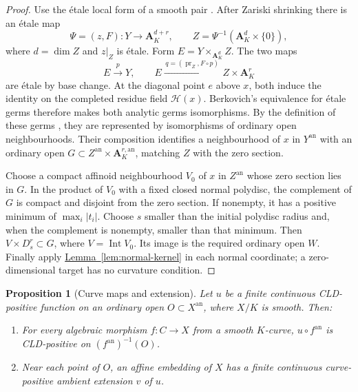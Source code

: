 \documentclass[11pt]{amsart}
\newtheorem{proposition}[theorem]{Proposition}
\theoremstyle{definition}
\theoremstyle{remark}
\numberwithin{equation}{section}
\newcommand{\an}{\mathrm{an}}
\newcommand{\Aff}{\mathbf A}
\newcommand{\namedref}[2]{%
 \begingroup
 \ifstrequal{#1}{Section}{\hypersetup{linkcolor=sectionteal}}{%
  \ifstrequal{#1}{Appendix}{\hypersetup{linkcolor=sectionteal}}{}}%
 \hyperref[#2]{#1~\ref*{#2}}%
 \endgroup}
\DeclareMathOperator{\Int}{Int}
\begin{document}
\begin{proof}
Use the \'etale local form of a smooth pair
\cite[Lemma 37.17.1, Tag 0FUE]{Stacks}. After Zariski shrinking there
is an \'etale map
\[
 \Psi=(z,F):Y\longrightarrow\Aff_K^{d+r},\qquad
 Z=\Psi^{-1}(\Aff_K^d\times\{0\}),
\]
where \(d=\dim Z\) and \(z|_Z\) is \'etale. Form
\(E=Y\times_{\Aff_K^d}Z\). The two maps
\[
 E\xrightarrow{\,p\,}Y,\qquad
 E\xrightarrow{\,q=(\operatorname{pr}_Z,F\circ p)\,}
                       Z\times\Aff_K^r
\]
are \'etale by base change. At the diagonal point \(e\) above \(x\),
both induce the identity on the completed residue field
\(\mathscr H(x)\). Berkovich's equivalence for \'etale germs
\cite[Theorem 3.4.1]{Ber93} therefore makes both analytic germs
isomorphisms. By the definition of these germs
\cite[Section 3.4]{Ber93}, they are represented by isomorphisms of
ordinary open neighbourhoods. Their composition identifies a
neighbourhood of \(x\) in \(Y^\an\) with an ordinary open
\(G\subset Z^\an\times\Aff_K^{r,\an}\), matching \(Z\) with the
zero section.

Choose a compact affinoid neighbourhood \(V_0\) of \(x\) in \(Z^\an\)
whose zero section lies in \(G\). In the product of \(V_0\) with a
fixed closed normal polydisc, the complement of \(G\) is compact
and disjoint from the zero section. If nonempty, it has a positive
minimum of \(\max_i|t_i|\). Choose \(s\) smaller than the initial
polydisc radius and, when the complement is nonempty, smaller than
that minimum. Then \(V\times D_s^r\subset G\), where \(V=\Int V_0\).
Its image is the required ordinary open \(W\).
Finally apply \namedref{Lemma}{lem:normal-kernel} in each normal coordinate;
a zero-dimensional target has no curvature condition.
\end{proof}

\begin{proposition}[Curve maps and extension]\label{prop:curve-restriction}
Let \(u\) be a finite continuous CLD-positive function on an ordinary
open \(O\subset X^\an\), where \(X/K\) is smooth. Then:
\begin{enumerate}
\item For every algebraic morphism \(f:C\to X\) from a smooth
\(K\)-curve, \(u\circ f^\an\) is CLD-positive on
\((f^\an)^{-1}(O)\).
\item Near each point of \(O\), an affine embedding of \(X\) has
a finite continuous curve-positive ambient extension \(v\) of \(u\).
\end{enumerate}
\end{proposition}
\end{document}
